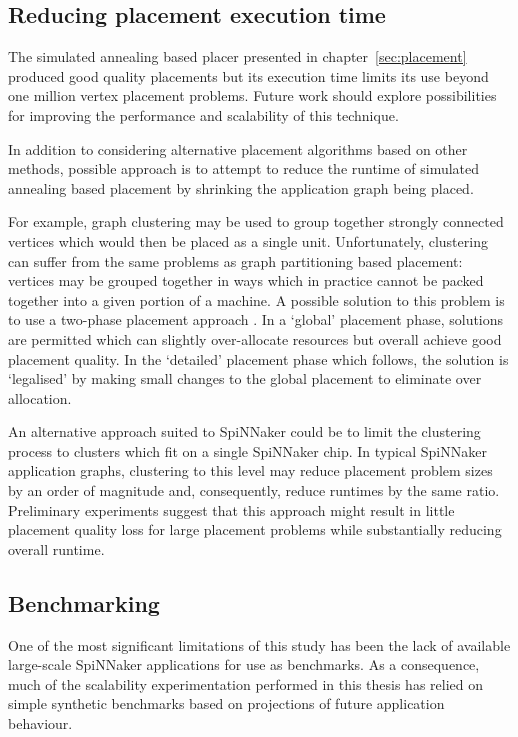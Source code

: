 		\subsection{Reducing placement execution time}
			
			The simulated annealing based placer presented in
			chapter~\ref{sec:placement} produced good quality placements but its
			execution time limits its use beyond one million vertex placement
			problems. Future work should explore possibilities for improving the
			performance and scalability of this technique.
			
			In addition to considering alternative placement algorithms based on
			other methods, possible approach is to attempt to reduce the runtime of
			simulated annealing based placement by shrinking the application graph
			being placed.
			
			For example, graph clustering \cite{schaeffer07} may be used to group
			together strongly connected vertices which would then be placed as a
			single unit.  Unfortunately, clustering can suffer from the same problems
			as graph partitioning based placement: vertices may be grouped together
			in ways which in practice cannot be packed together into a given portion
			of a machine.  A possible solution to this problem is to use a two-phase
			placement approach \cite{kahng11}. In a `global' placement phase,
			solutions are permitted which can slightly over-allocate resources but
			overall achieve good placement quality. In the `detailed' placement phase
			which follows, the solution is `legalised' by making small changes to the
			global placement to eliminate over allocation.
			
			An alternative approach suited to SpiNNaker could be to limit the
			clustering process to clusters which fit on a single SpiNNaker chip. In
			typical SpiNNaker application graphs, clustering to this level may reduce
			placement problem sizes by an order of magnitude and, consequently,
			reduce runtimes by the same ratio. Preliminary experiments suggest that
			this approach might result in little placement quality loss for large
			placement problems while substantially reducing overall runtime.
		
		\subsection{Benchmarking}
			
			One of the most significant limitations of this study has been the lack
			of available large-scale SpiNNaker applications for use as benchmarks. As
			a consequence, much of the scalability experimentation performed in this
			thesis has relied on simple synthetic benchmarks based on projections of
			future application behaviour.
			

